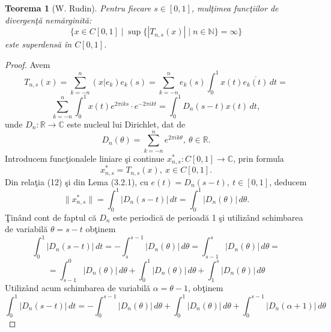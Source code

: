 \documentclass[a4paper,openany,12pt]{report}
\newtheorem{theorem}{Teorema}[section]
\begin{document}
\begin{theorem}[W. Rudin]
Pentru fiecare $s \in [0,1]$, mul\c timea func\c tiilor de divergen\c t\u a  nem\u arginit\u a:
\begin{equation*}
\bigg\{x \in C[0,1] \mid \sup \{\left|T_{n,s}(x) \right|\mid n \in \mathbb{N}\} = \infty \bigg\}
\end{equation*}
este superdens\u a \^ in $C[0,1]$.
\end{theorem}
\begin{proof}
Avem
\begin{equation}
T_{n,s}(x) = \sum_{k=-n}^{n}(x|e_k)e_k(s) = \sum_{k=-n}^{n} e_k(s) \int_{0}^{1} x(t) \overline{e_k(t)}\, dt = 
\end{equation}
\begin{equation*}
\sum_{k=-n}^{n} \int_0^1 x(t)e^{2\pi iks}\cdot e^{-2\pi ikt} = \int_0^1 D_n(s-t)x(t)\, dt,
\end{equation*}
unde $D_n : \mathbb{R}\rightarrow \mathbb{C}$ este nucleul lui Dirichlet, dat de
\begin{equation}
D_n(\theta) = \sum_{k=-n}^{n} e^{2\pi ik\theta}, \: \theta \in \mathbb{R}.
\end{equation}
Introducem func\c tionalele liniare \c si continue $x_{n,s}^* : C[0,1]\rightarrow \mathbb{C}$, prin formula
\begin{equation*}
x_{n,s}^* = T_{n,s}(x), \: x \in C[0,1].
\end{equation*}
Din rela\c tia (12) \c si din Lema (3.2.1), cu $e(t)=D_n(s-t),\: t \in [0,1]$, deducem
\begin{equation}
\|x_{n,s}^*\|= \int_0^1\left| D_n(s-t)\right| \, dt = \int_0^1 \left| D_n(\theta)\right|\, d\theta.
\end{equation}
\c Tin\^ and cont de faptul c\u a $D_n$ este periodic\u a de perioad\u a 1 \c si  utiliz\^ and schimbarea de variabil\u a $\theta=s-t$ ob\c tinem
\begin{equation*}
\int_0^1\left| D_n(s-t)\right|\, dt = -\int_s^{s-1}\left| D_n(\theta)\right|\, d\theta = \int_{s-1}^s\left| D_n(\theta)\right|\, d\theta=
\end{equation*}
\begin{equation*}
=\int_{s-1}^0\left| D_n(\theta)\right|\, d\theta + \int_0^1\left| D_n(\theta)\right|\, d\theta + \int_1^s\left| D_n(\theta)\right|\, d\theta
\end{equation*}
Utiliz\^ and acum schimbarea de variabil\u a $\alpha=\theta -1$, ob\c tinem 
\begin{equation*}
\int_0^1\left| D_n(s-t)\right|\, dt = -\int_0^{s-1}\left| D_n(\theta)\right|\, d \theta +\int_0^1\left| D_n(\theta)\right|\, d\theta+\int_0^{s-1}\left| D_n(\alpha + 1)\right|\, d\theta

\end{equation*}
\end{proof}
\end{document}
